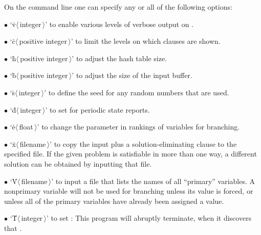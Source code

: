 On the command line one can specify any or all of the
following options:
\smallskip
\item{$\bullet$}
`\.v$\langle\,$integer$\,\rangle$' to enable various levels of verbose
output on .
\item{$\bullet$}
`\.c$\langle\,$positive integer$\,\rangle$' to limit the levels on which
clauses are shown.
\item{$\bullet$}
`\.h$\langle\,$positive integer$\,\rangle$' to adjust the hash table size.
\item{$\bullet$}
`\.b$\langle\,$positive integer$\,\rangle$' to adjust the size of the input
buffer.
\item{$\bullet$}
`\.s$\langle\,$integer$\,\rangle$' to define the seed for any random numbers
that are used.
\item{$\bullet$}
`\.d$\langle\,$integer$\,\rangle$' to set  for periodic state
reports.
\item{$\bullet$}
`\.e$\langle\,$float$\,\rangle$' to change the  parameter in
rankings of
variables for branching.
\item{$\bullet$}
`\.x$\langle\,$filename$\,\rangle$' to copy the input plus a
solution-eliminating clause to the specified file. If the given problem is
satisfiable in more than one way, a different solution can be obtained by
inputting that file.
\item{$\bullet$}
`\.V$\langle\,$filename$\,\rangle$' to input a file that lists the names
of all ``primary'' variables. A nonprimary variable will not be used for
branching unless its value is forced, or unless all of the primary variables
have already been assigned a value.
\item{$\bullet$}
`\.T$\langle\,$integer$\,\rangle$' to set : This program will
abruptly terminate, when it discovers that .

